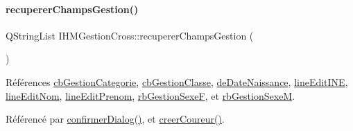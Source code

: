 \paragraph{\texorpdfstring{recuperer\+Champs\+Gestion()}{recupererChampsGestion()}}
{\footnotesize\ttfamily Q\+String\+List I\+H\+M\+Gestion\+Cross\+::recuperer\+Champs\+Gestion (\begin{DoxyParamCaption}{ }\end{DoxyParamCaption})\hspace{0.3cm}{\ttfamily [private]}}



Références \hyperlink{class_i_h_m_gestion_cross_a60cdc44c61bcd4e1e189c8de5556b89e}{cb\+Gestion\+Categorie}, \hyperlink{class_i_h_m_gestion_cross_af734c4b13942dd83fbbd0355e3728c9f}{cb\+Gestion\+Classe}, \hyperlink{class_i_h_m_gestion_cross_a1c63c5c91be88aef13d2582e48dff7d0}{de\+Date\+Naissance}, \hyperlink{class_i_h_m_gestion_cross_ab6c32fd079f81c4fa0b9ec0b4ef9bb61}{line\+Edit\+I\+NE}, \hyperlink{class_i_h_m_gestion_cross_a633102626c5dedd575b51a1ba5c6e708}{line\+Edit\+Nom}, \hyperlink{class_i_h_m_gestion_cross_a7bea7529f01cf8ca8f365d418aae52d5}{line\+Edit\+Prenom}, \hyperlink{class_i_h_m_gestion_cross_a4474ef47310eb3511befdf1beaa18b56}{rb\+Gestion\+SexeF}, et \hyperlink{class_i_h_m_gestion_cross_a7d471a7f96862dcd302f7f8cc52dfea4}{rb\+Gestion\+SexeM}.



Référencé par \hyperlink{class_i_h_m_gestion_cross_a144933ab31ae263be7267b93bfd53a82}{confirmer\+Dialog()}, et \hyperlink{class_i_h_m_gestion_cross_a6000b152ba3febb45d6c409519168ba2}{creer\+Coureur()}.



